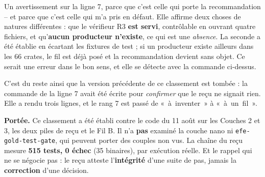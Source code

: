 \documentclass[10pt]{article}
\newcommand{\code}[1]{\texttt{\small #1}}
\begin{document}
Un avertissement sur la ligne 7, parce que c'est celle qui porte la recommandation -- et parce que
c'est celle qui m'a pris en défaut. Elle affirme deux choses de natures différentes : que le vérifieur
R3 \textbf{est servi}, contrôlable en ouvrant quatre fichiers, et qu'\textbf{aucun producteur
n'existe}, ce qui est une \emph{absence}. La seconde a été établie en écartant les fixtures de test ;
si un producteur existe ailleurs dans les 66 crates, le fil est déjà posé et la recommandation devient
sans objet. Ce serait une erreur dans le bon sens, et elle se détecte avec la commande ci-dessus.

C'est du reste ainsi que la version précédente de ce classement est tombée : la commande de la ligne 7
avait été écrite pour \emph{confirmer} que le reçu ne signait rien. Elle a rendu trois lignes, et le
rang 7 est passé de \mbox{« à inventer »} à \mbox{« à un fil »}.

\begin{these}
\small\textbf{Portée.} Ce classement a été établi contre le code du 11 août sur les Couches 2 et 3, les
deux piles de reçu et le Fil B. Il n'a \textbf{pas} examiné la couche nano ni \code{efe-gold-test-gate},
qui peuvent porter des couples non vus. La chaîne du reçu mesure \textbf{515 tests, 0 échec}
(35 binaires), par exécution réelle. Et le rappel qui ne se négocie pas : le reçu atteste
l'\textbf{intégrité} d'une suite de pas, jamais la \textbf{correction} d'une décision.
\end{these}
\end{document}
